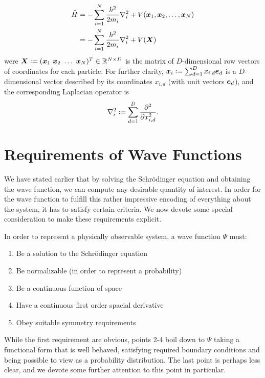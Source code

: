 \documentclass[Thesis.tex]{subfiles}
\begin{document}
\begin{align}
    \hat H &= - \sum_{i=1}^N \frac{\hbar^2}{2m_i} \laplacian_i + V(\vb x_1, \vb x_2,\dots,
    \vb x_N)\\
    &= -\sum_{i=1}^N \frac{\hbar^2}{2m_i} \laplacian_i + V(\vb
    X)\label{eq:Hamiltonian-operator-general}
\end{align}
were $\bm{X} \vcentcolon= (\bm{x}_1\ \bm{x}_2\ \dots\ \bm{x}_N)^T\in \mathbb{R}^{N\times D}$ is the matrix
of $D$-dimensional row vectors of coordinates for each particle. For further clarity,
$\bm{x}_i \vcentcolon= \sum_{d=1}^D x_{i,d} \bm{e}_d$ is a $D$-dimensional vector described by
its coordinates $x_{i,d}$ (with unit vectors $\bm{e}_d$), and the corresponding Laplacian
operator is
\begin{align}
    \laplacian_i \defeq \sum_{d = 1}^D \pdv[2]{}{x_{i,d}}.
\end{align}


\section{Requirements of Wave Functions}\label{sec:requirements-of-wave-functions}

We have stated earlier that by solving the Schrödinger equation and obtaining the wave
function, we can compute any desirable quantity of interest. In order for the wave
function to fulfill this rather impressive encoding of everything about the system, it has
to satisfy certain criteria. We now devote some special consideration to make these
requirements explicit.

In order to represent a physically observable system, a wave function $\Psi$ must:
\begin{enumerate}
    \item Be a solution to the Schrödinger equation
    \item Be normalizable (in order to represent a probability)
    \item Be a continuous function of space
    \item Have a continuous first order spacial derivative
    \item Obey suitable symmetry requirements
\end{enumerate}
%
While the first requirement are obvious, points 2-4 boil down to $\Psi$ taking a
functional form that is well behaved, satisfying required boundary conditions and being
possible to view as a probability distribution. The last point is perhaps less clear, and
we devote some further attention to this point in particular.
\end{document}
